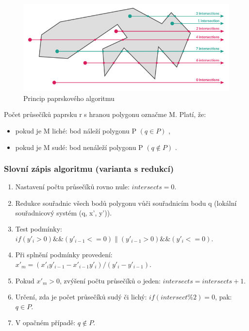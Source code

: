\documentclass[a4paper,11pt,twoside]{article}
\begin{document}
\vspace{0.2cm}
\begin{figure}[hbt!] 
\begin{center}
\includegraphics[width=15cm]{pictures/ray.png} 
\caption[Princip paprskového algoritmu]{Princip paprskového algoritmu \cite{ray}}
\label{fig:ray}
\end{center}
\end{figure}
\vspace{-0.4cm}

\noindent Počet průsečíků paprsku r s hranou polygonu označme M. Platí, že:
\begin{itemize}
\item pokud je M liché: bod náleží polygonu P $(q\in P)$ ,
\item pokud je M sudé: bod nenáleží polygonu P $(q { \not\in } P)$ .
\end{itemize}

\subsubsection{Slovní zápis algoritmu (varianta s redukcí)}
\begin{enumerate}
\item Nastavení počtu průsečíků rovno nule:  $ intersects = 0$.
\item Redukce souřadnic všech bodů polygonu vůči souřadnicím bodu q (lokální souřadnicový systém (q, x', y')).
\item Test podmínky:  $if(y'_i > 0)\&\&(y'_{i-1} <= 0)\|(y'_{i-1} > 0)\&\&(y'_{i} <= 0)$. 
\item Při splnění podmínky provedení:  $ x'_m = (x'_i y'_{i-1} - x'_{i-1} y'_i ) / (y'_i - y'_{i-1})$. 
\item Pokud $x'_m > 0$, zvýšení počtu průsečíků o jeden: $ intersects = intersects +1$.
\item Určení, zda je počet průsečíků sudý či lichý: $if (intersect\%2) = 0$, pak: $q\in P$.
\item V opačném případě: $q {\not \in} P$.
\end{enumerate}
\end{document}
